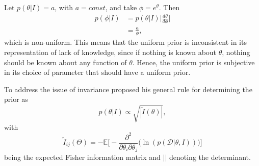 \begin{example}
	Let $p(\theta|I)=a$, with $a=const$, and take $\phi=e^\theta$. Then~\citep{Sivia2006} 
	\begin{equation}
		\begin{split}
			p(\phi|I)&=p(\theta|I)\bigg|\frac{d\theta}{d\phi}\bigg|\\
			&=\frac{a}{\phi},
		\end{split}
	\end{equation}
	which is non-uniform. This means that the uniform prior is inconsistent in its representation of lack of knowledge, since if nothing is known about $\theta$, nothing should be known about any function of $\theta$. Hence, the uniform prior is subjective in its choice of parameter that should have a uniform prior.
\end{example}
To address the issue of invariance \citet{Jeffreys46} proposed his general rule for determining the prior as
\begin{equation}
	p(\theta|I)\propto \sqrt{|\tilde{I}(\theta)|},
	\label{j1}
\end{equation}
with 
\begin{equation}
	\tilde{I}_{ij}(\Theta)=-\mathbb{E}\bigg[-\frac{\partial^2}{\partial \theta_i\partial \theta_j}\bigg(\ln(p(\mathcal{D}|\theta,I))\bigg)\bigg]
	\label{f1}
\end{equation}
being the expected Fisher information matrix and $||$ denoting the determinant.
